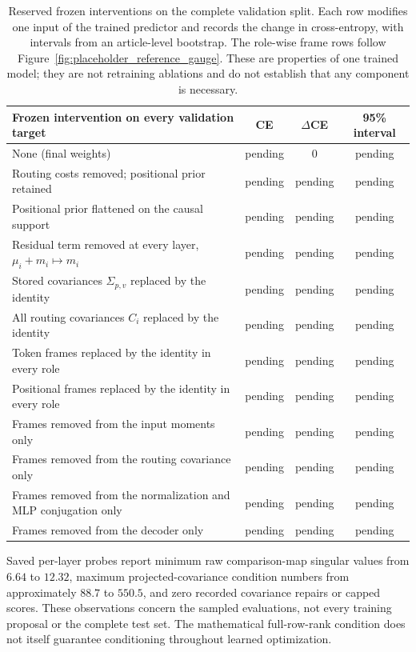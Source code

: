 \documentclass[twoside,11pt]{article}
\begin{document}
\begin{table}[htbp]
\centering
\small
\begin{tabularx}{\textwidth}{@{}>{\raggedright\arraybackslash}Xccc@{}}
\toprule
Frozen intervention on every validation target & CE & $\Delta$CE & 95\% interval \\
\midrule
None (final weights) & pending & 0 & pending \\
Routing costs removed; positional prior retained & pending & pending & pending \\
Positional prior flattened on the causal support & pending & pending & pending \\
Residual term removed at every layer, $\mu_i+m_i\mapsto m_i$ & pending & pending & pending \\
Stored covariances $\Sigma_{p,v}$ replaced by the identity & pending & pending & pending \\
All routing covariances $C_i$ replaced by the identity & pending & pending & pending \\
Token frames replaced by the identity in every role & pending & pending & pending \\
Positional frames replaced by the identity in every role & pending & pending & pending \\
Frames removed from the input moments only & pending & pending & pending \\
Frames removed from the routing covariance only & pending & pending & pending \\
Frames removed from the normalization and MLP conjugation only & pending & pending & pending \\
Frames removed from the decoder only & pending & pending & pending \\
\bottomrule
\end{tabularx}
\caption{Reserved frozen interventions on the complete validation split. Each row modifies one input of the trained predictor and records the change in cross-entropy, with intervals from an article-level bootstrap. The role-wise frame rows follow Figure~\ref{fig:placeholder_reference_gauge}. These are properties of one trained model; they are not retraining ablations and do not establish that any component is necessary.}
\label{tab:placeholder_interventions}
\end{table}

Saved per-layer probes report minimum raw comparison-map singular values from $6.64$ to $12.32$, maximum projected-covariance condition numbers from approximately $88.7$ to $550.5$, and zero recorded covariance repairs or capped scores. These observations concern the sampled evaluations, not every training proposal or the complete test set. The mathematical full-row-rank condition does not itself guarantee conditioning throughout learned optimization.
\end{document}
